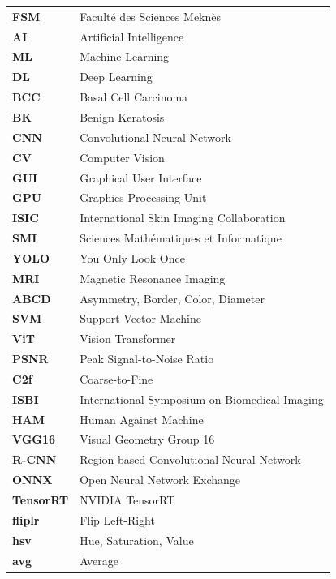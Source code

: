 \documentclass[a4paper,12pt]{report}
\begin{document}
\begin{spacing}{1.5}
\begin{table}[H]
\centering
\renewcommand{\arraystretch}{1.2}
\begin{tabular}{@{}p{3cm}p{11cm}@{}}
\textbf{FSM}     & Faculté des Sciences Meknès \\
\textbf{AI}      & Artificial Intelligence \\
\textbf{ML}      & Machine Learning \\
\textbf{DL}      & Deep Learning \\
\textbf{BCC}     & Basal Cell Carcinoma \\
\textbf{BK}      & Benign Keratosis \\
\textbf{CNN}     & Convolutional Neural Network \\
\textbf{CV}      & Computer Vision \\
\textbf{GUI}     & Graphical User Interface \\
\textbf{GPU}     & Graphics Processing Unit \\
\textbf{ISIC}    & International Skin Imaging Collaboration \\
\textbf{SMI}     & Sciences Mathématiques et Informatique \\
\textbf{YOLO}    & You Only Look Once \\
\textbf{MRI}     & Magnetic Resonance Imaging \\
\textbf{ABCD}    & Asymmetry, Border, Color, Diameter \\
\textbf{SVM}     & Support Vector Machine \\
\textbf{ViT}     & Vision Transformer \\
\textbf{PSNR}    & Peak Signal-to-Noise Ratio \\
\textbf{C2f}     & Coarse-to-Fine \\
\textbf{ISBI}    & International Symposium on Biomedical Imaging \\
\textbf{HAM}     & Human Against Machine \\
\textbf{VGG16}   & Visual Geometry Group 16 \\
\textbf{R-CNN}   & Region-based Convolutional Neural Network \\
\textbf{ONNX}    & Open Neural Network Exchange \\
\textbf{TensorRT} & NVIDIA TensorRT \\
\textbf{fliplr} & Flip Left-Right \\
\textbf{hsv} & Hue, Saturation, Value \\
\textbf{avg} & Average \\
\end{tabular}
\end{table}


\end{spacing}
\end{document}
